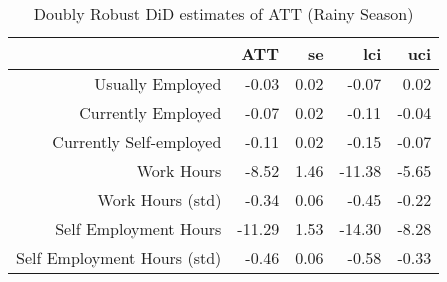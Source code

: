 \begin{table}[ht]
\centering
\begin{tabular}{rrrrr}
  \toprule
 & ATT & se & lci & uci \\ 
  \midrule
Usually Employed & -0.03 & 0.02 & -0.07 & 0.02 \\ 
  Currently Employed & -0.07 & 0.02 & -0.11 & -0.04 \\ 
  Currently Self-employed & -0.11 & 0.02 & -0.15 & -0.07 \\ 
  Work Hours & -8.52 & 1.46 & -11.38 & -5.65 \\ 
  Work Hours (std) & -0.34 & 0.06 & -0.45 & -0.22 \\ 
  Self Employment Hours & -11.29 & 1.53 & -14.30 & -8.28 \\ 
  Self Employment Hours (std) & -0.46 & 0.06 & -0.58 & -0.33 \\ 
   \bottomrule
\end{tabular}
\caption{Doubly Robust DiD estimates of ATT (Rainy Season)} 
\end{table}
